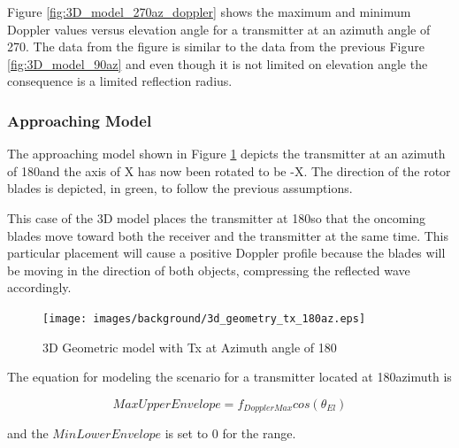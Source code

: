 Figure \ref{fig:3D_model_270az_doppler} shows the maximum and minimum Doppler values versus elevation angle for a transmitter at an azimuth angle of 270\textdegree. The data from the figure is similar to the data from the previous Figure \ref{fig:3D_model_90az} and even though it is not limited on elevation angle the consequence is a limited reflection radius.


\subsubsection{Approaching Model}
The approaching model shown in Figure \ref{fig:3D_model_180az} depicts the transmitter at an azimuth of 180\textdegree \space and the axis of X has now been rotated to be -X. The direction of the rotor blades is depicted, in green, to follow the previous assumptions.

This case of the 3D model places the transmitter at 180\textdegree \space so that the oncoming blades move toward both the receiver and the transmitter at the same time. This particular placement will cause a positive Doppler profile because the blades will be moving in the direction of both objects, compressing the reflected wave accordingly.

\begin{figure}
	\begin{center}
		\texttt{[image: images/background/3d\_geometry\_tx\_180az.eps]}
		\caption{3D Geometric model with Tx at Azimuth angle of 180\textdegree}
		\label{fig:3D_model_180az}
	\end{center}
\end{figure}

The equation for modeling the scenario for a transmitter located at 180\textdegree \space azimuth is

\begin{equation}
	MaxUpperEnvelope = f_{DopplerMax}cos(\theta_{El})
	\label{eq:theory_180_upper}
\end{equation}

and the $MinLowerEnvelope$ is set to 0 for the range.

